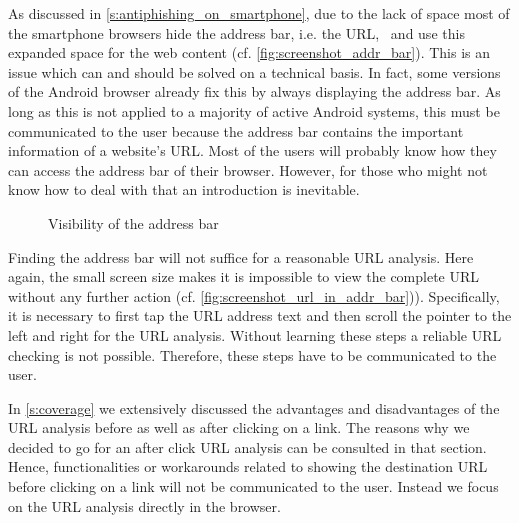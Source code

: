 \begin{description}[leftmargin=0cm]
	\item[Invisible Address Bar:] As discussed in \autoref{s:antiphishing_on_smartphone}, due to the lack of space most of the smartphone browsers hide the address bar, i.e. the URL,~\cite{amrutkar2012measuring} and use this expanded space for the web content (cf. \autoref{fig:screenshot_addr_bar}). This is an issue which can and should be solved on a technical basis. In fact, some versions of the Android browser already fix this by always displaying the address bar. As long as this is not applied to a majority of active Android systems, this must be communicated to the user because the address bar contains the important information of a website's URL.
Most of the users will probably know how they can access the address bar of their browser.
However, for those who might not know how to deal with that an introduction is inevitable.
\begin{figure}
\centering
{}
\caption{Visibility of the address bar}
\label{fig:screenshot_addr_bar}
\end{figure}
	\item[Analyze Complete URL Via Address Bar:] Finding the address bar will not suffice for a reasonable URL analysis. 
Here again, the small screen size makes it is impossible to view the complete URL without any further action (cf. \autoref{fig:screenshot_url_in_addr_bar})).
Specifically, it is necessary to first tap the URL address text and then scroll the pointer to the left and right for the URL analysis.
Without learning these steps a reliable URL checking is not possible. 
Therefore, these steps have to be communicated to the user.

	\item[Analyze URL After Click:] In \autoref{s:coverage} we extensively discussed the advantages and disadvantages of the URL analysis before as well as after clicking on a link.
The reasons why we decided to go for an after click URL analysis can be consulted in that section.
Hence, functionalities or workarounds related to showing the destination URL before clicking on a link will not be communicated to the user.
Instead we focus on the URL analysis directly in the browser.
\end{description}

